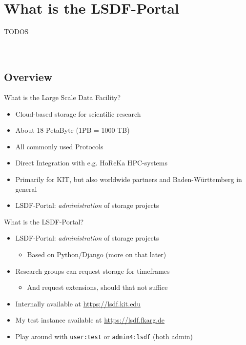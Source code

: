 \section{What is the LSDF-Portal}

\begin{frame}[c]{TODOS}
     \\
     \\
     \\
\end{frame}


\subsection{Overview}
\begin{frame}[c]{What is the Large Scale Data Facility?}
    \large
    \begin{itemize}[<+(1)->]
        \item Cloud-based storage for scientific research
        \item About 18 PetaByte (1PB = 1000 TB)
        \item All commonly used Protocols
        \item Direct Integration with e.g. HoReKa HPC-systems
        \item Primarily for KIT, but also worldwide partners and Baden-Württemberg in general
        \item LSDF-Portal: {\em administration} of storage projects
    \end{itemize}
\end{frame}


\begin{frame}[c,fragile]{What is the LSDF-Portal?}
    \large
    \begin{itemize}[<+(1)->]
        \item LSDF-Portal: {\em administration} of storage projects
            \begin{itemize}[<+(1)->]
                \item Based on Python/Django (more on that later)
            \end{itemize}
        \item Research groups can request storage for timeframes
            \begin{itemize}[<+(1)->]
                \item And request extensions, should that not suffice
            \end{itemize}
        \item Internally available at \url{https://lsdf.kit.edu}
        \item My test instance available at \url{https://lsdf.fkarg.de}
        \item Play around with \verb!user:test! or \verb!admin4:lsdf! (both admin)
    \end{itemize}
\end{frame}

